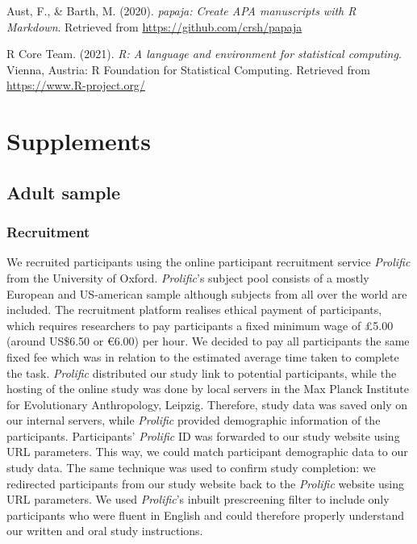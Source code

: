 \documentclass[
  english,
  man,floatsintext]{apa6}
\newlength{\cslhangindent}
\newlength{\cslentryspacingunit} %
\newenvironment{CSLReferences}[2] %
 {%
  \setlength{\parindent}{0pt}
  \ifodd #1
  \let\oldpar\par
  \def\par{\hangindent=\cslhangindent\oldpar}
  \fi
  \setlength{\parskip}{#2\cslentryspacingunit}
 }%
 {}
\begin{document}
\hypertarget{refs}{}
\begin{CSLReferences}{1}{0}
\leavevmode{}%
Aust, F., \& Barth, M. (2020). \emph{{papaja}: {Create} {APA} manuscripts with {R Markdown}}. Retrieved from \url{https://github.com/crsh/papaja}

\leavevmode{}%
R Core Team. (2021). \emph{R: A language and environment for statistical computing}. Vienna, Austria: R Foundation for Statistical Computing. Retrieved from \url{https://www.R-project.org/}

\end{CSLReferences}

\endgroup

\newpage

\hypertarget{supplements}{%
\section{Supplements}\label{supplements}}

\hypertarget{adult-sample}{%
\subsection{Adult sample}\label{adult-sample}}

\hypertarget{recruitment}{%
\subsubsection{Recruitment}\label{recruitment}}

We recruited participants using the online participant recruitment service \emph{Prolific} from the University of Oxford. \emph{Prolific}'s subject pool consists of a mostly European and US-american sample although subjects from all over the world are included. The recruitment platform realises ethical payment of participants, which requires researchers to pay participants a fixed minimum wage of £5.00 (around US\$6.50 or €6.00) per hour. We decided to pay all participants the same fixed fee which was in relation to the estimated average time taken to complete the task.
\emph{Prolific} distributed our study link to potential participants, while the hosting of the online study was done by local servers in the Max Planck Institute for Evolutionary Anthropology, Leipzig. Therefore, study data was saved only on our internal servers, while \emph{Prolific} provided demographic information of the participants.
Participants' \emph{Prolific} ID was forwarded to our study website using URL parameters. This way, we could match participant demographic data to our study data. The same technique was used to confirm study completion: we redirected participants from our study website back to the \emph{Prolific} website using URL parameters.
We used \emph{Prolific}'s inbuilt prescreening filter to include only participants who were fluent in English and could therefore properly understand our written and oral study instructions.
\end{document}
